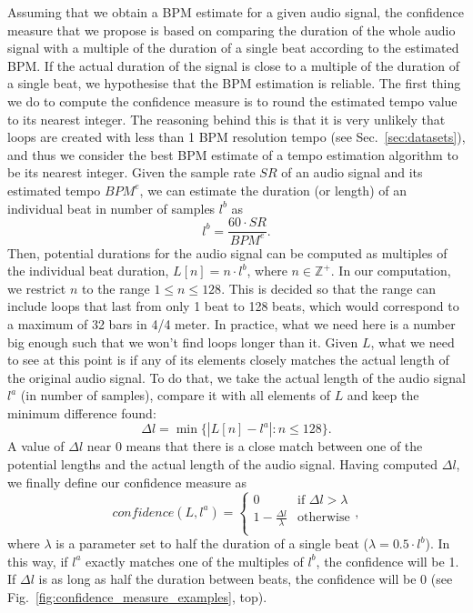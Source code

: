 \documentclass{article}
\begin{document}
Assuming that we obtain a BPM estimate for a given audio signal, the confidence measure that we propose is based on comparing the duration of the whole audio signal with a multiple of the duration of a single beat according to the estimated BPM. If the actual duration of the signal is close to a multiple of the duration of a single beat, we hypothesise that the BPM estimation is reliable.
The first thing we do to compute the confidence measure is to round the estimated tempo value to its nearest integer.
The reasoning behind this is that it is very unlikely that loops are created with less than 1 BPM resolution tempo (see Sec.~\ref{sec:datasets}), and thus we consider the best BPM estimate of a tempo estimation algorithm to be its nearest integer.
Given the sample rate $SR$ of an audio signal and its estimated tempo $BPM^e$, we can estimate the duration (or length) of an individual beat in number of samples $l^b$ as
$$l^b = \frac{60 \cdot SR}{BPM^e}.$$ 
Then, potential durations for the audio signal can be computed as multiples of the individual beat duration, $L[n] = n \cdot l^b$, where $n \in \mathbb{Z}^+$.
In our computation, we restrict $n$ to the range $1 \le n \le 128$.
This is decided so that the range can include loops that last from only 1 beat to 128 beats, which would correspond to a maximum of 32 bars in 4/4 meter. 
In practice, what we need here is a number big enough such that we won't find loops longer than it.
Given $L$, what we need to see at this point is if any of its elements closely matches the actual length of the original audio signal. 
To do that, we take the actual length of the audio signal $l^a$ (in number of samples), compare it with all elements of $L$ and keep the minimum difference found:
$$ \Delta l = \min\{|L[n]-l^a|:n\le 128\}. $$
A value of $\Delta l$ near 0 means that there is a close match between one of the potential lengths and the actual length of the audio signal. 
Having computed $\Delta l$, we finally define our confidence measure as 
$$ 
confidence(L,l^a) = \begin{cases} 
	0 & \text{if } \Delta l > \lambda \\
    1 - \frac{\Delta l}{\lambda} & \text{otherwise}\\
\end{cases},
$$
where $\lambda$ is a parameter set to half the duration of a single beat ($\lambda = 0.5 \cdot l^b$). In this way, if $l^a$ exactly matches one of the multiples of $l^b$, the confidence will be 1. If $\Delta l$ is as long as half the duration between beats, the confidence will be 0 (see Fig.~\ref{fig:confidence_measure_examples}, top).
\end{document}
